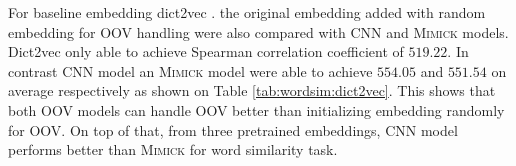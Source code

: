     For baseline embedding dict2vec \citep{dict2vect2017tissier}. the
    original embedding added with random embedding for OOV handling
    were also compared with CNN and \textsc{Mimick} models. Dict2vec
    only able to achieve Spearman correlation coefficient of $519.22$.
    In contrast CNN model an \textsc{Mimick} model were able to
    achieve $554.05$ and $551.54$ on average respectively as shown on
    Table \ref{tab:wordsim:dict2vec}. This shows that both OOV models
    can handle OOV better than initializing embedding randomly for
    OOV. On top of that, from three pretrained embeddings, CNN model
    performs better than \textsc{Mimick} for word similarity task.